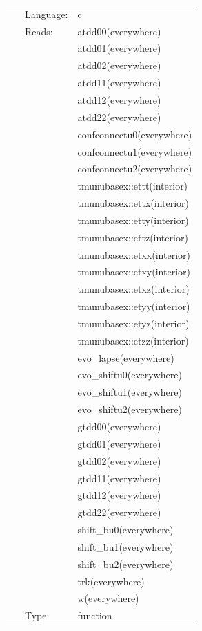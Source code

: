  \begin{tabular*}{160mm}{cll} 
~ & Language:  & c \\ 
~ & Reads:  & atdd00(everywhere) \\ 
~& ~ &atdd01(everywhere)\\ 
~& ~ &atdd02(everywhere)\\ 
~& ~ &atdd11(everywhere)\\ 
~& ~ &atdd12(everywhere)\\ 
~& ~ &atdd22(everywhere)\\ 
~& ~ &confconnectu0(everywhere)\\ 
~& ~ &confconnectu1(everywhere)\\ 
~& ~ &confconnectu2(everywhere)\\ 
~& ~ &tmunubasex::ettt(interior)\\ 
~& ~ &tmunubasex::ettx(interior)\\ 
~& ~ &tmunubasex::etty(interior)\\ 
~& ~ &tmunubasex::ettz(interior)\\ 
~& ~ &tmunubasex::etxx(interior)\\ 
~& ~ &tmunubasex::etxy(interior)\\ 
~& ~ &tmunubasex::etxz(interior)\\ 
~& ~ &tmunubasex::etyy(interior)\\ 
~& ~ &tmunubasex::etyz(interior)\\ 
~& ~ &tmunubasex::etzz(interior)\\ 
~& ~ &evo\_lapse(everywhere)\\ 
~& ~ &evo\_shiftu0(everywhere)\\ 
~& ~ &evo\_shiftu1(everywhere)\\ 
~& ~ &evo\_shiftu2(everywhere)\\ 
~& ~ &gtdd00(everywhere)\\ 
~& ~ &gtdd01(everywhere)\\ 
~& ~ &gtdd02(everywhere)\\ 
~& ~ &gtdd11(everywhere)\\ 
~& ~ &gtdd12(everywhere)\\ 
~& ~ &gtdd22(everywhere)\\ 
~& ~ &shift\_bu0(everywhere)\\ 
~& ~ &shift\_bu1(everywhere)\\ 
~& ~ &shift\_bu2(everywhere)\\ 
~& ~ &trk(everywhere)\\ 
~& ~ &w(everywhere)\\ 
~ & Type:  & function \\ 

\end{tabular*}

